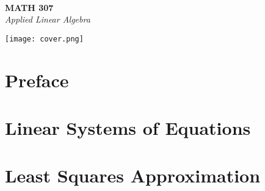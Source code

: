 \documentclass[11pt]{book}
\begin{document}
\frontmatter

\begin{titlepage}
\phantom{.} \vspace{0.5in} \\
{\Huge \bf MATH 307} \vspace{1mm} \\
{\it Applied Linear Algebra}
\begin{center}
\texttt{[image: cover.png]}
\end{center}
\end{titlepage}

\thispagestyle{empty}
\setcounter{page}{0}
\tableofcontents


\chapter{Preface}



\mainmatter

\chapter{Linear Systems of Equations} \newpage





 \newpage
 \newpage



\chapter{Least Squares Approximation} \newpage





 \newpage

\end{document}

